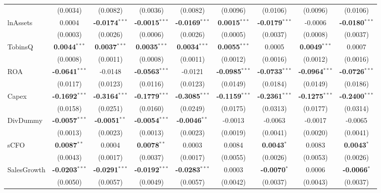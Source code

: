 \documentclass[11pt,a4paper]{article}
\begin{document}
\begin{table}[htbp]
\begin{tabular}{lcccccccc}
 & (0.0034) & (0.0082) & (0.0036) & (0.0082) & (0.0096) & (0.0106) & (0.0096) & (0.0106) \\
lnAssets & 0.0004 & \textbf{-0.0174}$^{***}$ & \textbf{-0.0015}$^{***}$ & \textbf{-0.0169}$^{***}$ & \textbf{0.0015}$^{***}$ & \textbf{-0.0179}$^{***}$ & -0.0006 & \textbf{-0.0180}$^{***}$ \\
 & (0.0003) & (0.0026) & (0.0006) & (0.0026) & (0.0005) & (0.0037) & (0.0008) & (0.0037) \\
TobinsQ & \textbf{0.0044}$^{***}$ & \textbf{0.0037}$^{***}$ & \textbf{0.0035}$^{***}$ & \textbf{0.0034}$^{***}$ & \textbf{0.0055}$^{***}$ & 0.0005 & \textbf{0.0049}$^{***}$ & 0.0007 \\
 & (0.0008) & (0.0011) & (0.0008) & (0.0011) & (0.0012) & (0.0016) & (0.0012) & (0.0016) \\
ROA & \textbf{-0.0641}$^{***}$ & -0.0148 & \textbf{-0.0563}$^{***}$ & -0.0121 & \textbf{-0.0985}$^{***}$ & \textbf{-0.0733}$^{***}$ & \textbf{-0.0964}$^{***}$ & \textbf{-0.0726}$^{***}$ \\
 & (0.0117) & (0.0123) & (0.0116) & (0.0123) & (0.0149) & (0.0184) & (0.0149) & (0.0186) \\
Capex & \textbf{-0.1692}$^{***}$ & \textbf{-0.3164}$^{***}$ & \textbf{-0.1779}$^{***}$ & \textbf{-0.3085}$^{***}$ & \textbf{-0.1159}$^{***}$ & \textbf{-0.2361}$^{***}$ & \textbf{-0.1275}$^{***}$ & \textbf{-0.2400}$^{***}$ \\
 & (0.0158) & (0.0251) & (0.0160) & (0.0249) & (0.0175) & (0.0313) & (0.0177) & (0.0314) \\
DivDummy & \textbf{-0.0057}$^{***}$ & \textbf{-0.0051}$^{**}$ & \textbf{-0.0054}$^{***}$ & \textbf{-0.0046}$^{**}$ & -0.0013 & -0.0063 & -0.0017 & -0.0065 \\
 & (0.0013) & (0.0023) & (0.0013) & (0.0023) & (0.0019) & (0.0041) & (0.0020) & (0.0041) \\
sCFO & \textbf{0.0087}$^{**}$ & 0.0004 & \textbf{0.0078}$^{**}$ & 0.0003 & 0.0084 & \textbf{0.0043}$^{*}$ & 0.0083 & \textbf{0.0043}$^{*}$ \\
 & (0.0043) & (0.0017) & (0.0037) & (0.0017) & (0.0055) & (0.0026) & (0.0053) & (0.0026) \\
SalesGrowth & \textbf{-0.0203}$^{***}$ & \textbf{-0.0291}$^{***}$ & \textbf{-0.0192}$^{***}$ & \textbf{-0.0283}$^{***}$ & 0.0003 & \textbf{-0.0070}$^{*}$ & 0.0006 & \textbf{-0.0066}$^{*}$ \\
 & (0.0050) & (0.0057) & (0.0049) & (0.0057) & (0.0042) & (0.0037) & (0.0043) & (0.0037) \\

\end{tabular}
\end{table}
\end{document}
